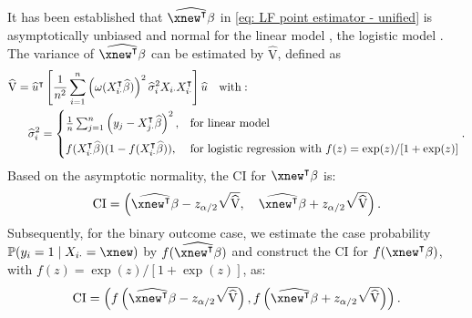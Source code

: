 It has been established that $\widehat{\xnew^\intercal \beta}$ in \eqref{eq: LF point estimator - unified} is asymptotically unbiased and normal for the linear model \citep{cai2021optimal}, the logistic model \citep{guo2021inference,cai2021statistical}. %
The variance of $\widehat{\xnew^\intercal \beta}$ can be estimated by $\widehat{\mathrm{V}}$, defined as
\begin{align}
    \widehat{\mathrm{V}} &= \widehat{u}^\intercal \left[\frac{1}{n^2} \sum_{i=1}^n \left(\omega(X_{i\cdot}^\intercal \widehat{\beta}) \right)^2 \widehat{\sigma}_i^2 X_{i\cdot} X_{i\cdot}^\intercal \right] \widehat{u}
    \quad \textrm{with}: \; \label{eq: LF Variance - unified}\\
    &\quad \widehat{\sigma}_i^2 = 
    \begin{cases}
    \frac{1}{n} \sum_{j=1}^n \left(y_j - X_{j\cdot}^\intercal \widehat{\beta}\right)^2, &\textrm{for linear model} \vspace{0.2cm}\\
    f(X_{i\cdot}^\intercal \widehat{\beta}) (1 - f(X_{i\cdot}^\intercal \widehat{\beta})), &\textrm{for logistic regression with } f(z) = \exp(z)/[1+\exp(z)] %
    \end{cases}.
    \label{eq: noise level - unified}
\end{align}
Based on the asymptotic normality, the CI for $\xnew^\intercal \beta$ is:
\begin{equation*}
\mathrm{CI}=\left(\widehat{\xnew^{\intercal}\beta}-z_{\alpha / 2} \sqrt{\widehat{\mathrm{V}}}, \quad \widehat{\xnew^{\intercal}\beta}+z_{\alpha / 2} \sqrt{\widehat{\mathrm{V}}}\right).
\label{eq: LF CI - unified}
\end{equation*}
Subsequently, for the binary outcome case, we estimate the case probability $\mathbb{P}(y_i = 1 \mid X_{i\cdot} = \xnew)$ by $f(\widehat{\xnew^\intercal \beta})$ and construct the CI for $f(\xnew^\intercal \beta)$, with $f(z) = \exp(z)/[1+\exp(z)]$, as:
\begin{equation*}
    \mathrm{CI} = \left(f\left(\widehat{\xnew^\intercal \beta} - z_{\alpha /2}\sqrt{\widehat{\mathrm{V}}} \right), 
    f\left(\widehat{\xnew^\intercal \beta} + z_{\alpha /2}\sqrt{\widehat{\mathrm{V}}} \right)\right).
\end{equation*}


